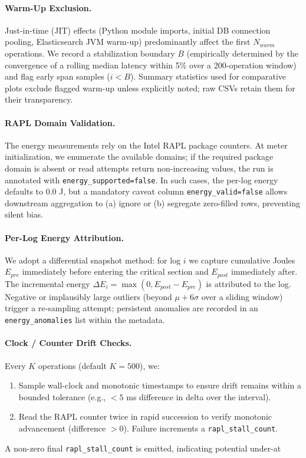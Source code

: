 \paragraph{Warm-Up Exclusion.} Just-in-time (JIT) effects (Python module imports, initial DB connection pooling, Elasticsearch JVM warm-up) predominantly affect the first $N_{warm}$ operations. We record a stabilization boundary $B$ (empirically determined by the convergence of a rolling median latency within 5\% over a 200-operation window) and flag early span samples ($i < B$). Summary statistics used for comparative plots exclude flagged warm-up unless explicitly noted; raw CSVs retain them for their transparency.

\paragraph{RAPL Domain Validation.} The energy measurements rely on the Intel RAPL package counters. At meter initialization, we enumerate the available domains; if the required package domain is absent or read attempts return non-increasing values, the run is annotated with \texttt{energy\_supported=false}. In such cases, the per-log energy defaults to 0.0 J, but a mandatory caveat column \texttt{energy\_valid=false} allows downstream aggregation to (a) ignore or (b) segregate zero-filled rows, preventing silent bias.

\paragraph{Per-Log Energy Attribution.} We adopt a differential snapshot method: for log $i$ we capture cumulative Joules $E_{pre}$ immediately before entering the critical section and $E_{post}$ immediately after. The incremental energy $\Delta E_i = \max(0, E_{post} - E_{pre})$ is attributed to the log. Negative or implausibly large outliers (beyond $\mu + 6\sigma$ over a sliding window) trigger a re-sampling attempt; persistent anomalies are recorded in an \texttt{energy\_anomalies} list within the metadata.

\paragraph{Clock / Counter Drift Checks.} Every $K$ operations (default $K=500$), we:
\begin{enumerate}
  \item Sample wall-clock and monotonic timestamps to ensure drift remains within a bounded tolerance (e.g., $<5$ ms difference in delta over the interval).
  \item Read the RAPL counter twice in rapid succession to verify monotonic advancement (difference $>0$). Failure increments a \texttt{rapl\_stall\_count}.
\end{enumerate}
A non-zero final \texttt{rapl\_stall\_count} is emitted, indicating potential under-at

